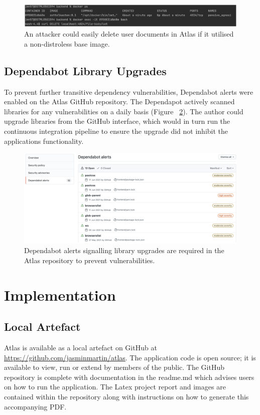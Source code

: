 \documentclass{article}
\begin{document}
\begin{figure}[!htb]
  \centering
      \includegraphics[width=1\textwidth]{images/distroless.png}
  \caption{An attacker could easily delete user documents in Atlas if it utilised a non-distroless base image.}
  \label{fig:distroless}
\end{figure}

\subsection{Dependabot Library Upgrades}

To prevent further transitive dependency vulnerabilities, Dependabot alerts were enabled on the Atlas GitHub repository. The Dependapot actively scanned libraries for any vulnerabilities on a daily basis (Figure ~\ref{fig:dependabot}). The author could upgrade libraries from the GitHub interface, which would in turn run the continuous integration pipeline to ensure the upgrade did not inhibit the applications functionality. 

\begin{figure}[!ht]
  \centering
      \includegraphics[width=1\textwidth]{images/dependabot.png}
  \caption{Dependabot alerts signalling library upgrades are required in the Atlas repository to prevent vulnerabilities.}
  \label{fig:dependabot}
\end{figure}

 
\clearpage
\section{Implementation}

\subsection{Local Artefact}
Atlas is available as a local artefact on GitHub at \url{https://github.com/jasminmartin/atlas}. The application code is open source; it is available to view, run or extend by members of the public. The GitHub repository is complete with documentation in the readme.md which advises users on how to run the application. The Latex project report and images are contained within the repository along with instructions on how to generate this accompanying PDF.
\end{document}
